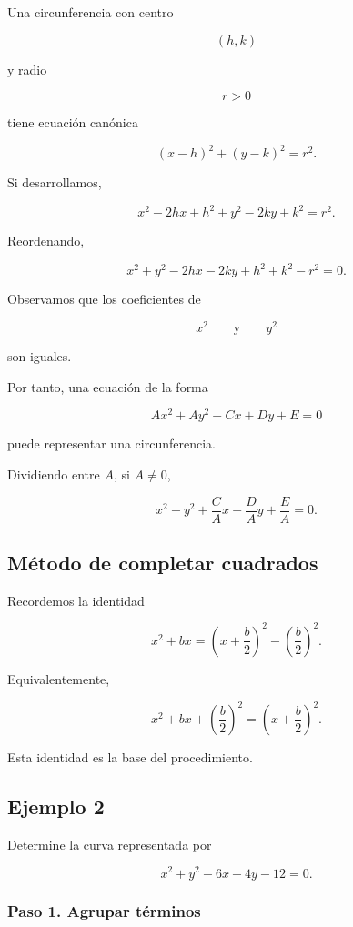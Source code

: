 \documentclass[12pt]{article}
\begin{document}
{Una circunferencia con centro

\[
(h,k)
\]

y radio

\[
r>0
\]

tiene ecuación canónica

\[
\boxed{
(x-h)^2+(y-k)^2=r^2.
}
\]

Si desarrollamos,

\[
x^2-2hx+h^2+y^2-2ky+k^2=r^2.
\]

Reordenando,

\[
x^2+y^2-2hx-2ky+h^2+k^2-r^2=0.
\]

Observamos que los coeficientes de

\[
x^2
\qquad\text{y}\qquad
y^2
\]

son iguales.

Por tanto, una ecuación de la forma

\[
Ax^2+Ay^2+Cx+Dy+E=0
\]

puede representar una circunferencia.

Dividiendo entre \(A\), si \(A\neq0\),

\[
x^2+y^2+\frac{C}{A}x+\frac{D}{A}y+\frac{E}{A}=0.
\]

\subsection{Método de completar cuadrados}

Recordemos la identidad

\[
x^2+bx
=
\left(x+\frac{b}{2}\right)^2
-
\left(\frac{b}{2}\right)^2.
\]

Equivalentemente,

\[
x^2+bx+\left(\frac{b}{2}\right)^2
=
\left(x+\frac{b}{2}\right)^2.
\]

Esta identidad es la base del procedimiento.

\subsection{Ejemplo 2}

Determine la curva representada por

\[
x^2+y^2-6x+4y-12=0.
\]

\subsubsection*{Paso 1. Agrupar términos}

}
\end{document}
